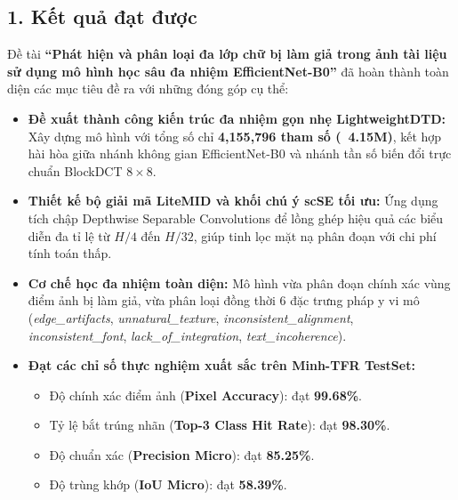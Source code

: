 \subsection{1. Kết quả đạt được}

\indent\indent Đề tài \textbf{``Phát hiện và phân loại đa lớp chữ bị làm giả trong ảnh tài liệu sử dụng mô hình học sâu đa nhiệm EfficientNet-B0''} đã hoàn thành toàn diện các mục tiêu đề ra với những đóng góp cụ thể:

\begin{itemize}[label={--}, itemsep=3pt]
    \item \textbf{Đề xuất thành công kiến trúc đa nhiệm gọn nhẹ LightweightDTD:} Xây dựng mô hình với tổng số chỉ \textbf{4,155,796 tham số (~4.15M)}, kết hợp hài hòa giữa nhánh không gian EfficientNet-B0 và nhánh tần số biến đổi trực chuẩn BlockDCT $8 \times 8$.
    \item \textbf{Thiết kế bộ giải mã LiteMID và khối chú ý scSE tối ưu:} Ứng dụng tích chập Depthwise Separable Convolutions để lồng ghép hiệu quả các biểu diễn đa tỉ lệ từ $H/4$ đến $H/32$, giúp tinh lọc mặt nạ phân đoạn với chi phí tính toán thấp.
    \item \textbf{Cơ chế học đa nhiệm toàn diện:} Mô hình vừa phân đoạn chính xác vùng điểm ảnh bị làm giả, vừa phân loại đồng thời 6 đặc trưng pháp y vi mô (\textit{edge\_artifacts}, \textit{unnatural\_texture}, \textit{inconsistent\_alignment}, \textit{inconsistent\_font}, \textit{lack\_of\_integration}, \textit{text\_incoherence}).
    \item \textbf{Đạt các chỉ số thực nghiệm xuất sắc trên Minh-TFR TestSet:}
    \begin{itemize}[label={+}, itemsep=1pt]
        \item Độ chính xác điểm ảnh (\textbf{Pixel Accuracy}): đạt \textbf{99.68\%}.
        \item Tỷ lệ bắt trúng nhãn (\textbf{Top-3 Class Hit Rate}): đạt \textbf{98.30\%}.
        \item Độ chuẩn xác (\textbf{Precision Micro}): đạt \textbf{85.25\%}.
        \item Độ trùng khớp (\textbf{IoU Micro}): đạt \textbf{58.39\%}.
    \end{itemize}
\end{itemize}
